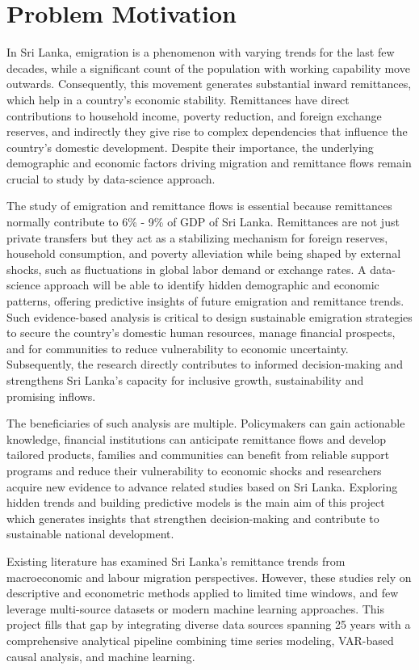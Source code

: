 \documentclass[sigconf]{acmart}
\begin{document}
\section{Problem Motivation}

In Sri Lanka, emigration is a phenomenon with varying trends for the last few decades, while a significant count of the population with working capability move outwards. Consequently, this movement generates substantial inward remittances, which help in a country's economic stability. Remittances have direct contributions to household income, poverty reduction, and foreign exchange reserves, and indirectly they give rise to complex dependencies that influence the country's domestic development. Despite their importance, the underlying demographic and economic factors driving migration and remittance flows remain crucial to study by data-science approach.

The study of emigration and remittance flows is essential because remittances normally contribute to 6\% - 9\% of GDP of Sri Lanka\cite{remittance-gdp}. Remittances are not just private transfers but they act as a stabilizing mechanism for foreign reserves, household consumption, and poverty alleviation while being shaped by external shocks, such as fluctuations in global labor demand or exchange rates. A data-science approach will be able to identify hidden demographic and economic patterns, offering predictive insights of future emigration and remittance trends. Such evidence-based analysis is critical to design sustainable emigration strategies to secure the country's domestic human resources, manage financial prospects, and for communities to reduce vulnerability to economic uncertainty. Subsequently, the research directly contributes to informed decision-making and strengthens Sri Lanka's capacity for inclusive growth, sustainability and promising inflows.

The beneficiaries of such analysis are multiple. Policymakers can gain actionable knowledge, financial institutions can anticipate remittance flows and develop tailored products, families and communities can benefit from reliable support programs and reduce their vulnerability to economic shocks and researchers acquire new evidence to advance related studies based on Sri Lanka. Exploring hidden trends and building predictive models is the main aim of this project which generates insights that strengthen decision-making and contribute to sustainable national development.

Existing literature has examined Sri Lanka's remittance trends from macroeconomic and labour migration perspectives\cite{ilo-migration}. However, these studies rely on descriptive and econometric methods applied to limited time windows, and few leverage multi-source datasets or modern machine learning approaches. This project fills that gap by integrating diverse data sources spanning 25 years with a comprehensive analytical pipeline combining time series modeling, VAR-based causal analysis, and machine learning.
\end{document}
